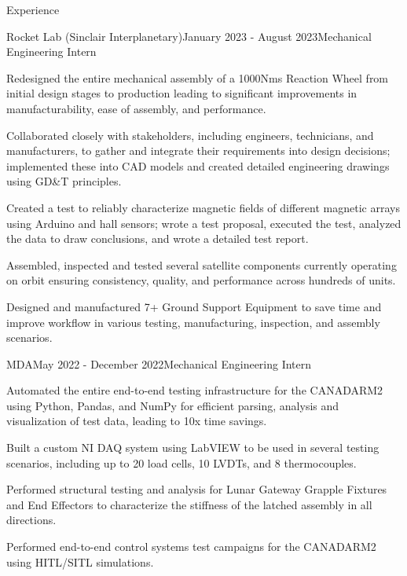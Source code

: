 \documentclass{resume} %
\begin{document}
\begin{rSection}{Experience}

\begin{rSubsection}{Rocket Lab (Sinclair Interplanetary)}{January 2023 - August 2023}{Mechanical Engineering Intern}{}
\item Redesigned the entire mechanical assembly of a 1000Nms Reaction Wheel from initial design stages to production leading to significant improvements in manufacturability, ease of assembly, and performance.
\item Collaborated closely with stakeholders, including engineers, technicians, and manufacturers, to gather and integrate their requirements into design decisions; implemented these into CAD models and created detailed engineering drawings using GD\&T principles.
\item Created a test to reliably characterize magnetic fields of different magnetic arrays using Arduino and hall sensors; wrote a test proposal, executed the test, analyzed the data to draw conclusions, and wrote a detailed test report.
\item Assembled, inspected and tested several satellite components currently operating on orbit ensuring consistency, quality, and performance across hundreds of units.
\item Designed and manufactured 7+ Ground Support Equipment to save time and improve workflow in various testing, manufacturing, inspection, and assembly scenarios.
\end{rSubsection}

\begin{rSubsection}{MDA}{May 2022 - December 2022}{Mechanical Engineering Intern}{}
\item Automated the entire end-to-end testing infrastructure for the CANADARM2 using Python, Pandas, and NumPy for efficient parsing, analysis and visualization of test data, leading to 10x time savings.
\item Built a custom NI DAQ system using LabVIEW to be used in several testing scenarios, including up to 20 load cells, 10 LVDTs, and 8 thermocouples.
\item Performed structural testing and analysis for Lunar Gateway Grapple Fixtures and End Effectors to characterize the stiffness of the latched assembly in all directions.
\item Performed end-to-end control systems test campaigns for the CANADARM2 using HITL/SITL simulations.
\end{rSubsection}


\end{rSection}
\end{document}
